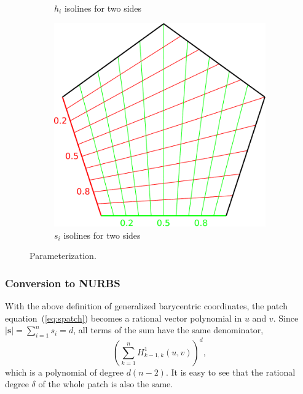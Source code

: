 \documentclass[9pt,academicons]{article}
\begin{document}
\begin{figure}
\begin{subfigure}{0.30\textwidth}
\begin{minipage}[b][5cm][b]{\textwidth}
      \vspace*{-2mm}
    \end{minipage}
    \caption{$h_i$ isolines for two sides}
    \label{fig:h}
  \end{subfigure}
  \hfill
  \begin{subfigure}{0.3\textwidth}
    \begin{minipage}[b][5cm][b]{\textwidth}
      \centering
      \includegraphics[width = \textwidth]{images/s-params.pdf}
      \vspace*{-2mm}
    \end{minipage}
    \caption{$s_i$ isolines for two sides}
    \label{fig:s}
  \end{subfigure}
  \caption{Parameterization.}
  \label{fig:parameters}
\end{figure}

\subsubsection{Conversion to NURBS}
\label{subsubsec:conversion}
With the above definition of generalized barycentric coordinates,
the patch equation~(\ref{eq:spatch}) becomes a rational vector polynomial in $u$ and $v$.
Since $|\mathbf{s}|=\sum_{i=1}^ns_i=d$, all terms of the sum have the same denominator,
\begin{equation}
  \left(\sum_{k=1}^nH_{k-1,k}^1(u,v)\right)^d,
\end{equation}
which is a polynomial of degree $d(n-2)$. It is easy to see that the rational degree $\delta$ of
the whole patch is also the same.
\end{document}
